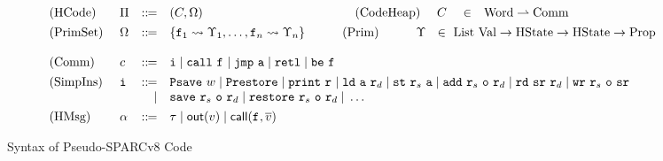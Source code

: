 \begin{figure*}[!t]
    \centering
    \small
    \[
        \begin{array}{llllcllll}
            \TYPE{(HCode)} & \HMd & \define & (\code, \hprimset) & &
            \qquad\qquad \
            \TYPE{(CodeHeap)} & \ \code \ & \in & \TYPE{Word} \rightharpoonup \TYPE{Comm}
            \\
            \\[-8pt]
            \TYPE{(PrimSet)} \  & \hprimset & \define &
            \multicolumn{6}{l}
                {
                    \{ \lab{1} \rightsquigarrow \hprim_1, \dots, \lab{n} \rightsquigarrow \hprim_n \}
                    \qquad\quad
                    \TYPE{(Prim)} \qquad\quad \hprim \ \ \in \
                    \TYPE{List} \ \TYPE{Val} \rightarrow \TYPE{HState} \rightarrow
                    \TYPE{HState} \rightarrow \TYPE{Prop}
                }  \\
            \\
            \TYPE{(Comm)} & \comm & \define &
            \multicolumn{6}{l}
            {
                \simplins{} \sepline \call{} \ \lab{}
                \sepline \jmp{} \ \aexp \sepline \retl \sepline \be{} \ \lab{}
            }
            \\
            \\[-8pt]
            \TYPE{(SimpIns)} & \simplins{} & \define &
            \multicolumn{6}{l}
            {
                \Psave \ \word \sepline \Prestore  \sepline \cprint \ \reg{} \sepline
                \ld{} \ \aexp \ \reg{d} \sepline
                \st{} \ \reg{s} \ \aexp \sepline \cadd{} \ \reg{s} \ \oexp \ \reg{d}
                \sepline
                \rd \ \sr \ \reg{d} \sepline \cwr \ \reg{s} \ \oexp \ \sr
            }
            \\
            & & \quad | &
            \multicolumn{6}{l}
            {
                \csave{} \ \reg{s} \ \oexp \ \reg{d} \sepline
                \crestore{} \ \reg{s} \ \oexp \ \reg{d} \sepline
                \dots
            }
            \\
            \\[-8pt]
            \TYPE{(HMsg)} & \hmsg & \define & \empmsg \sepline \outEvt{\val} \sepline
            \callEvt{\lab{}, \args{\val}}
        \end{array}
    \]
    \vspace{-1em}
    \caption{Syntax of Pseudo-SPARCv8 Code}
    \label{fig:syntax-of-concur-pseudo-sparc}
\end{figure*}
